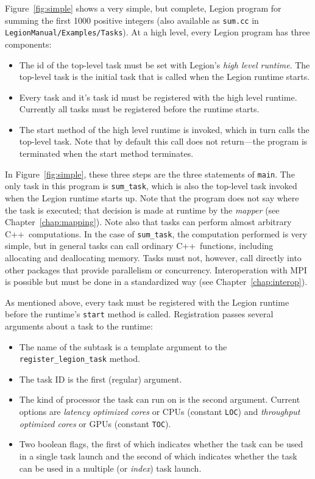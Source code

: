 \documentclass[11pt]{book}
\newcommand{\legionbook}[1]{{\tt LegionManual/Examples/#1}}
\newcommand{\Cpp}{C++}
\begin{document}
Figure~\ref{fig:simple} shows a very simple, but complete, Legion program for summing
the first 1000 positive integers (also available as {\tt sum.cc} in \legionbook{Tasks}).  
At a high level, every Legion program has three components:
\begin{itemize}
\item The id of the top-level task must be set with Legion's {\em high level runtime}.  The top-level
task is the initial task that is called when the Legion runtime starts.
\item Every task and it's task id must be registered with the high level runtime.  Currently all tasks
must be registered before the runtime starts.
\item The start method of the high level runtime is invoked, which in turn calls the top-level task.
Note that by default this call does not return---the program is terminated when the start method terminates.
\end{itemize}
In Figure~\ref{fig:simple}, these three steps are the three statements of {\tt main}.  
The only task in this program is {\tt sum\_task}, which is also the top-level task invoked when the
Legion runtime starts up.  Note that the program does not say where the task is executed; that decision is made
at runtime by the {\em mapper} (see Chapter~\ref{chap:mapping}).  Note also that tasks can perform almost arbitrary
\Cpp\ computations.  In the case of {\tt sum\_task}, the computation performed is very simple, but in general tasks
can call ordinary \Cpp\ functions, including allocating and deallocating memory.  Tasks must not, however,
call directly into other packages that provide parallelism or concurrency.  Interoperation with MPI is
possible but must be done in a standardized way (see Chapter~\ref{chap:interop}).  

As mentioned above, every task must be registered with the Legion runtime before
the runtime's {\tt start} method is called.  Registration passes several arguments about a
task to the runtime:
\begin{itemize}
\item The name of the subtask is a template argument to the {\tt register\_legion\_task} method.

\item The task ID is the first (regular) argument.

\item The kind of processor the task can run on is the second argument.  Current options are
{\em latency optimized cores} or CPUs (constant {\tt LOC}) and {\em throughput optimized cores} or GPUs
(constant {\tt TOC}).

\item Two boolean flags, the first of which indicates whether the task can be used in a single task
launch and the second of which indicates whether the task can be used in a multiple (or {\em index}) task
launch.
\end{itemize}
\end{document}

